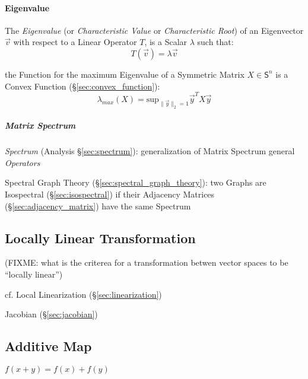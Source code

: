 \paragraph{Eigenvalue}\label{sec:eigenvalue}\hfill

The \emph{Eigenvalue} (or \emph{Characteristic Value} or \emph{Characteristic
  Root}) of an Eigenvector $\vec{v}$ with respect to a Linear Operator $T$, is a
Scalar $\lambda$ such that:
\[
  T(\vec{v}) = \lambda\vec{v}
\]

the Function for the maximum Eigenvalue of a Symmetric Matrix $X \in
\mathsf{S}^n$ is a Convex Function (\S\ref{sec:convex_function}):
\[
  \lambda_{max}(X) = \mathrm{sup}_{\|\vec{y}\|_2=1} \vec{y}^T X \vec{y}
\]



\subparagraph{Matrix Spectrum}\label{sec:matrix_spectrum}\hfill

\fist \emph{Spectrum} (Analysis \S\ref{sec:spectrum}): generalization of Matrix
Spectrum general \emph{Operators}

\fist Spectral Graph Theory (\S\ref{sec:spectral_graph_theory}): two Graphs are
Isospectral (\S\ref{sec:isospectral}) if their Adjacency Matrices
(\S\ref{sec:adjacency_matrix}) have the same Spectrum



\subsection{Locally Linear Transformation}\label{sec:locally_linear}


(FIXME: what is the criterea for a transformation betwen vector spaces to be
``locally linear'')

\fist cf. Local Linearization (\S\ref{sec:linearization})

\fist Jacobian (\S\ref{sec:jacobian})



\subsection{Additive Map}\label{sec:additive_map}

$f(x + y) = f(x) + f(y)$

